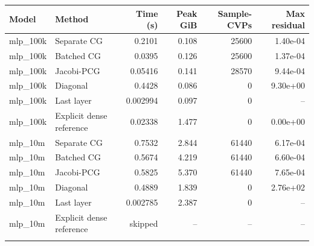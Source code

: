 \begin{tabular}{llrrrr}
\toprule
Model & Method & Time (s) & Peak GiB & Sample-CVPs & Max residual \\
\midrule
mlp\_100k & Separate CG & 0.2101 & 0.108 & 25600 & 1.40e-04 \\
mlp\_100k & Batched CG & 0.0395 & 0.126 & 25600 & 1.37e-04 \\
mlp\_100k & Jacobi-PCG & 0.05416 & 0.141 & 28570 & 9.44e-04 \\
mlp\_100k & Diagonal & 0.4428 & 0.086 & 0 & 9.30e+00 \\
mlp\_100k & Last layer & 0.002994 & 0.097 & 0 & -- \\
mlp\_100k & Explicit dense reference & 0.02338 & 1.477 & 0 & 0.00e+00 \\
\addlinespace
mlp\_10m & Separate CG & 0.7532 & 2.844 & 61440 & 6.17e-04 \\
mlp\_10m & Batched CG & 0.5674 & 4.219 & 61440 & 6.60e-04 \\
mlp\_10m & Jacobi-PCG & 0.5825 & 5.370 & 61440 & 7.65e-04 \\
mlp\_10m & Diagonal & 0.4889 & 1.839 & 0 & 2.76e+02 \\
mlp\_10m & Last layer & 0.002785 & 2.387 & 0 & -- \\
mlp\_10m & Explicit dense reference & skipped & -- & -- & -- \\
\addlinespace
\bottomrule
\end{tabular}
